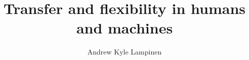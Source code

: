\documentclass{report}
\begin{document}
\title{Transfer and flexibility in humans and machines}
\author{Andrew Kyle Lampinen}

\beforepreface
{}

\afterpreface



\appendix



\end{document}

